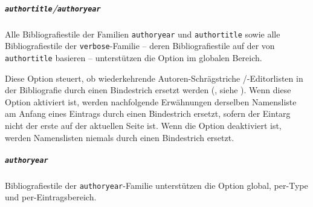 \documentclass{ltxdockit}[2011/03/25]
\begin{document}
\subparagraph{\texttt{authortitle}/\texttt{authoryear}} Alle Bibliografiestile
der Familien \texttt{authoryear} und \texttt{authortitle} sowie alle Bibliografiestile der \texttt{verbose}-Familie -- deren Bibliografiestile
auf  der von \texttt{authortitle} basieren -- unterstützen die Option
 im globalen Bereich.

\begin{optionlist}


Diese Option steuert, ob wiederkehrende Autoren-Schrägstriche \slash -Editorlisten in der Bibliografie durch einen Bindestrich ersetzt werden (, 
siehe ). Wenn diese Option aktiviert ist, werden nachfolgende
Erwähnungen derselben Namensliste am Anfang eines Eintrags durch einen Bindestrich ersetzt, sofern der Eintarg nicht der erste auf der aktuellen Seite ist.
Wenn die Option deaktiviert ist, werden Namenslisten niemals durch einen Bindestrich ersetzt. 
\end{optionlist}

\subparagraph{\texttt{authoryear}} Bibliografiestile der \texttt{authoryear}-Familie unterstützen die Option  global, per-Type und per-Eintragsbereich.
\end{document}

